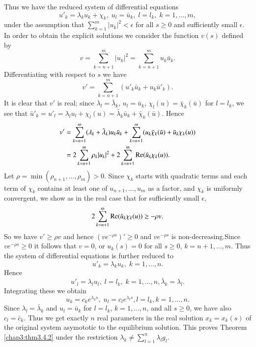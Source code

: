 Thus we have the reduced system of differential equations
$$
u'_k = \lambda_k u_k + \chi_k, \; u_l = \bar{u}_k,  \; l = l_k, \; k =1, \ldots, m, 
$$\pageoriginale
under the assumption that $\sum\limits^m_{k=1}|u_k|^2 < \epsilon$ for
all $s \geq 0$ and sufficiently small $\epsilon$. In order to obtain
the explicit solutions we consider the function $v(s)$ defined by  
$$
v = \sum\limits^m_{k=n+1} |u_k|^2 = \sum\limits^m_{k=n+1} u_k \bar{u}_k. 
$$
Differentiating with respect to $s$ we have 
$$
v' = \sum\limits^m_{k=n+1} (u'_k \bar{u}_k + u_k \bar{u}'_k).
$$
It is clear that $v'$ is real; since $\lambda_l = \bar{\lambda}_k$,
$u_l = \bar{u}_k$, $\chi_l (u) = \bar{\chi}_k(\bar{u})$ for $l=l_k$,
we see that $\bar{u}'_k = u'_l = \lambda_l u_l + \chi_l (u) =
\bar{\lambda}_k \bar{u}_k + \bar{\chi}_k(\bar{u})$. Hence 
\begin{align*}
v' & = \sum\limits^m_{k=n+1} (\lambda_k + \bar{\lambda}_k) u_k
\bar{u}_k + \sum\limits^m_{k=n+1} (u_k \bar{\chi}_k(\bar{u}) +
\bar{u}_k \chi_k(u))\\ 
& = 2 \sum\limits^m_{k=n+1} \rho_k |u_k|^2 + 2 \sum\limits^m_{k=n+1} \operatorname{Re} (\bar{u}_k \chi_k (u)). 
\end{align*}
Let $\rho = \min (\rho_{n+1}, \ldots, \rho_m) > 0$. Since $\chi_k$
starts with quadratic terms and each term of $\chi_k$ contains at
least one of $u_{n+1}, \ldots, u_m$ as a factor, and $\chi_k$ is
uniformly convergent, we show as in the real case that for
sufficiently small $\epsilon$, 
$$
2 \sum\limits^m_{k=n+1} \operatorname{Re} (\bar{u}_k \chi_k (u)) \geq - \rho v.
$$
So we have $v' \geq \rho v $ and hence $(v e^{-\rho s})' \geq 0 $ and
$ve^{-\rho s}$ is non-decreasing.\pageoriginale Since $ve^{-\rho s}
\geq 0$ it follows that $v = 0$, or $u_k(s) = 0$ for all $s \geq 0$,
$k =n+1, \ldots, m$. Thus the system of differential equations is
further reduced to  
$$
u'_k = \lambda_k u_k, \;k =1, \ldots, n.
$$
Hence
$$
u'_l = \lambda_l u_l, \; l = l_k, \; k =1 , \ldots, n ,
\bar{\lambda}_k  = \lambda_l.  
$$
Integrating these we obtain
$$
u_k= c_k e^{\lambda_k s}, \; u_l = c_l e^{\lambda_ls}, l = l_k, k = 1,
\ldots,n. 
$$
Since $\lambda_l = \bar{\lambda}_k$ and $u_l = \bar{u}_k$ for $l
=l_k$, $k =1, \ldots, n$, and all $s \geq 0$, we have also $c_l =
\bar{c}_k$. Thus we get exactly $n$ real parameters in the real
solution $x_k = x_k(s)$ of the original system asymototic to the
equilibrium solution. This proves Theorem \ref{chap3:thm3.4.2} under
the restriction $\lambda_k \neq \sum\limits^n_{l=1} \lambda_l g_l$.  

